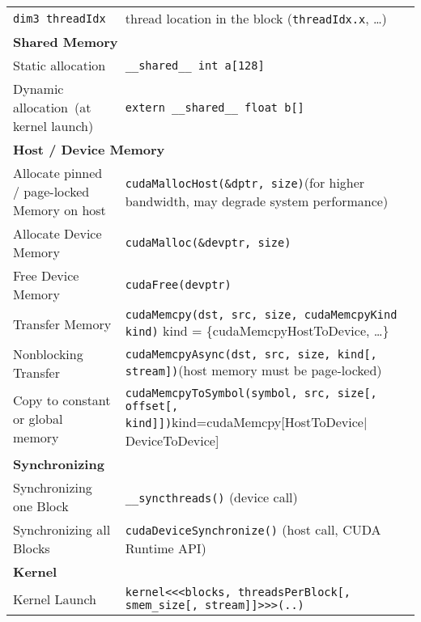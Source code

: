 \documentclass[a4paper,10pt,landscape]{article}
\begin{document}
\begin{multicols*}{2}
\begin{tabular}{p{4cm}p{9cm}}
\lstinline$dim3 threadIdx$ & thread location in the block (\lstinline$threadIdx.x$, \ldots)\\
\multicolumn{2}{l}{\textbf{Shared Memory}} \\
Static allocation & \lstinline$__shared__ int a[128]$ \\
Dynamic allocation\newline\ (at kernel launch) & \lstinline$extern __shared__ float b[]$\\
\multicolumn{2}{l}{\textbf{Host / Device Memory}} \\
Allocate pinned / page-locked Memory on host & \lstinline$cudaMallocHost(&dptr, size)$\newline(for higher bandwidth, may degrade system performance)\\
Allocate Device Memory & \lstinline$cudaMalloc(&devptr, size)$\\
Free Device Memory & \lstinline$cudaFree(devptr)$\\
Transfer Memory & \lstinline$cudaMemcpy(dst, src, size, cudaMemcpyKind kind)$\newline
kind = \{cudaMemcpyHostToDevice, \ldots\}\\
Nonblocking Transfer & \lstinline$cudaMemcpyAsync(dst, src, size, kind[, stream])$\newline(host memory must be page-locked)\\
Copy to constant or global memory & \lstinline$cudaMemcpyToSymbol(symbol, src, size[, offset[, kind]])$\newline kind=cudaMemcpy[HostToDevice$|$DeviceToDevice]\\
\multicolumn{2}{l}{\textbf{Synchronizing}} \\
Synchronizing one Block & \lstinline$__syncthreads()$ (device call)\\
Synchronizing all Blocks & \lstinline$cudaDeviceSynchronize()$ (host call, CUDA Runtime API)\\
\multicolumn{2}{l}{\textbf{Kernel}} \\
Kernel Launch&\lstinline$kernel<<<blocks, threadsPerBlock[, smem_size[, stream]]>>>(..)$\\
\end{tabular}
%
\vfill
\columnbreak


\end{multicols*}
\end{document}

